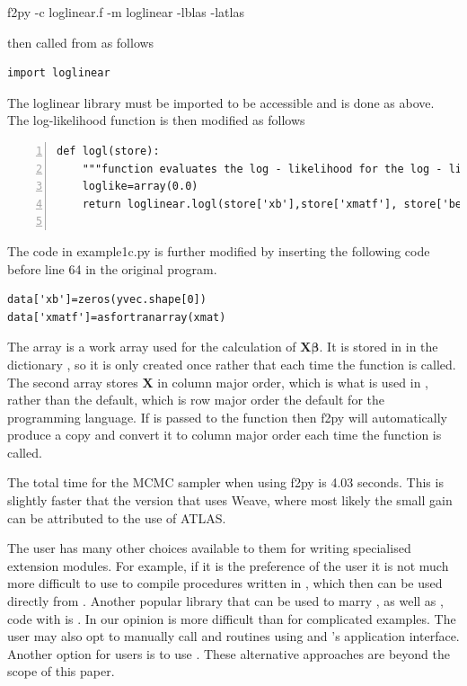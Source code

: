 \documentclass[article]{jss}
\begin{document}
f2py -c loglinear.f -m loglinear -lblas -latlas

then called from  as follows


\begin{lstlisting}[basicstyle={\scriptsize}]
import loglinear
\end{lstlisting}


The loglinear library must be imported to be accessible and is done as
above. The log-likelihood function is then modified as follows


\begin{lstlisting}[basicstyle={\scriptsize},numbers=left]
def logl(store):
	"""function evaluates the log - likelihood for the log - linear model"""
	loglike=array(0.0)     
	return loglinear.logl(store['xb'],store['xmatf'], store['beta'],store['yvec'],loglike)
    
\end{lstlisting}


The code in example1c.py is further modified by inserting the
following code before line 64 in the original program.


\begin{lstlisting}[basicstyle={\scriptsize}]
data['xb']=zeros(yvec.shape[0])
data['xmatf']=asfortranarray(xmat)
\end{lstlisting}


The array  is a work array used for the
calculation of $\bm{X}\bm{\beta}.$ It is stored in in the
 dictionary , so it is only created once
rather that each time the function  is called. The second
array  stores $\bm{X}$ in column major order,
which is what is used in , rather than the
 default, which is row major order the default for
the  programming language. If  is
passed to the function  then f2py will
automatically produce a copy and convert it to column major order each
time the function  is called.

The total time for the MCMC sampler when using f2py is 4.03 seconds.
This is slightly faster that the version that uses Weave, where most
likely the small gain can be attributed to the use of ATLAS.

The user has many other choices available to them for writing
specialised extension modules. For example, if it is the preference of
the user it is not much more difficult to use  to compile
procedures written in , which then can be used directly
from . Another popular library that can be used to
marry , as well as , code with
 is . In our opinion  is more
difficult than  for complicated examples. The user may also
opt to manually call  and  routines using
 and 's  application
interface. Another option for  users is to use
 . These alternative approaches are beyond
the scope of this paper.
\end{document}

